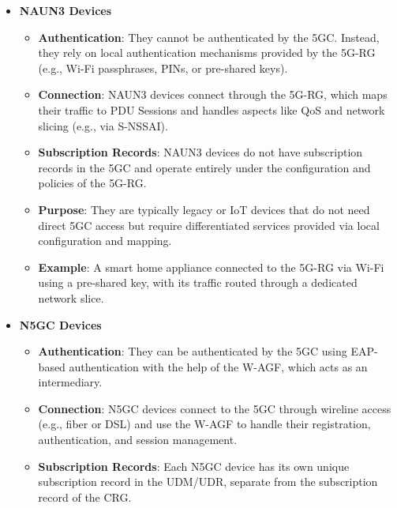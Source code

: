 \begin{itemize}
    \item {
        \textbf{\ac{NAUN3} Devices}
        \begin{itemize}
            \item {
                \textbf{Authentication}: They cannot be authenticated by the \ac{5GC}. Instead, they rely on local authentication mechanisms provided by the \ac{5G-RG} (e.g., Wi-Fi passphrases, \acp{PIN}, or pre-shared keys).
            }
            \item {
                \textbf{Connection}: \ac{NAUN3} devices connect through the \ac{5G-RG}, which maps their traffic to \ac{PDU} Sessions and handles aspects like \ac{QoS} and network slicing (e.g., via \ac{S-NSSAI}).
            }
            \item {
                \textbf{Subscription Records}: \ac{NAUN3} devices do not have subscription records in the \ac{5GC} and operate entirely under the configuration and policies of the \ac{5G-RG}.
            }
            \item {
                \textbf{Purpose}: They are typically legacy or \ac{IoT} devices that do not need direct \ac{5GC} access but require differentiated services provided via local configuration and mapping.
            }
            \item {
                \textbf{Example}: A smart home appliance connected to the \ac{5G-RG} via Wi-Fi using a pre-shared key, with its traffic routed through a dedicated network slice.
            }
        \end{itemize}    
    }
    \item {
        \textbf{\ac{N5GC} Devices}
        \begin{itemize}
            \item {
                \textbf{Authentication}: They can be authenticated by the \ac{5GC} using \ac{EAP}-based authentication with the help of the \ac{W-AGF}, which acts as an intermediary.
            }
            \item {
                \textbf{Connection}: \ac{N5GC} devices connect to the \ac{5GC} through wireline access (e.g., fiber or \ac{DSL}) and use the \ac{W-AGF} to handle their registration, authentication, and session management.
            }
            \item {
                \textbf{Subscription Records}: Each \ac{N5GC} device has its own unique subscription record in the \ac{UDM}/\ac{UDR}, separate from the subscription record of the \ac{CRG}.
}
\end{itemize}}
\end{itemize}
